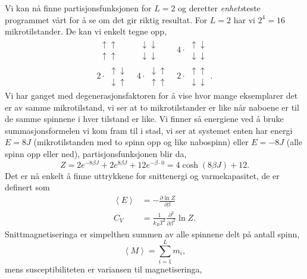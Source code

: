 \documentclass[norsk, 10pt]{article}
\def\mean#1{\left\langle #1 \right\rangle}
\begin{document}
Vi kan nå finne partisjonsfunksjonen for $L=2$ og deretter \emph{enhets}teste programmet vårt for å se om det gir riktig resultat. For $L=2$ har vi $2^{4}=16$ mikrotilstander. De kan vi enkelt tegne opp,
\begin{eqnarray}
	\begin{matrix} \uparrow\uparrow \\ \uparrow\uparrow \end{matrix} & \begin{matrix} \downarrow\downarrow \\ \downarrow\downarrow \end{matrix} & 4\cdot \begin{matrix} \uparrow\downarrow \\ \downarrow\downarrow \end{matrix}\\ 2\cdot\begin{matrix} \uparrow\downarrow \\ \downarrow\uparrow \end{matrix} & 4\cdot \begin{matrix} \downarrow\uparrow \\ \uparrow\uparrow \end{matrix} & 2\cdot\begin{matrix} \uparrow\uparrow \\ \downarrow\downarrow \end{matrix}.
\end{eqnarray}
Vi har ganget med degenerasjonsfaktoren for å vise hvor mange eksemplarer det er av samme mikrotilstand, vi ser at to mikrotilstander er like når naboene er til de samme spinnene i hver tilstand er like. Vi finner så energiene ved å bruke summasjonsformelen vi kom fram til i stad, vi ser at systemet enten har energi $E = 8J$ (mikrotilstanden med to spinn opp og like nabospinn) eller $E = -8J$ (alle spinn opp eller ned), partisjonsfunksjonen blir da,
$$ Z = 2e^{-8\beta J} + 2e^{8\beta J} + 12e^{-\beta \cdot0} = 4\cosh(8\beta J) + 12. $$
Det er nå enkelt å finne uttrykkene for snittenergi og varmekapasitet, de er definert som
\begin{align*}
	\mean E &= -\frac{\partial \ln Z}{\partial \beta} \\
	C_V &= \frac{1}{k_B T^2} \frac{\partial^2}{\partial \beta^2}\ln Z.
\end{align*}
Snittmagnetiseringa er simpelthen summen av alle spinnene delt på antall spinn,
$$ \mean M = \sum\limits_{i=1}^{L} m_i,$$
mens susceptibiliteten er variansen til magnetiseringa,
\end{document}

